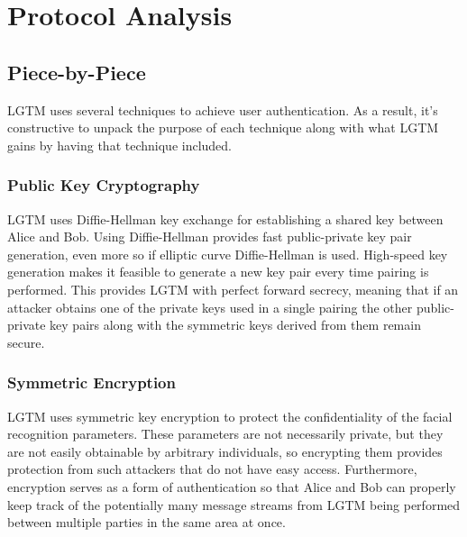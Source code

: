 \documentclass[12pt]{report}
\begin{document}
\chapter{Protocol Analysis}
\section{Piece-by-Piece}
LGTM uses several techniques to achieve user authentication. As a result, it's constructive to unpack the purpose of each technique along with what LGTM gains by having that technique included. \par

\subsection{Public Key Cryptography}
LGTM uses Diffie-Hellman key exchange \cite{DiffieHellman2006} for establishing a shared key between Alice and Bob. Using Diffie-Hellman provides fast public-private key pair generation, even more so if elliptic curve Diffie-Hellman is used. High-speed key generation makes it feasible to generate a new key pair every time pairing is performed. This provides LGTM with perfect forward secrecy, meaning that if an attacker obtains one of the private keys used in a single pairing the other public-private key pairs along with the symmetric keys derived from them remain secure. \par

\subsection{Symmetric Encryption}
LGTM uses symmetric key encryption to protect the confidentiality of the facial recognition parameters. These parameters are not necessarily private, but they are not easily obtainable by arbitrary individuals, so encrypting them provides protection from such attackers that do not have easy access. Furthermore, encryption serves as a form of authentication so that Alice and Bob can properly keep track of the potentially many message streams from LGTM being performed between multiple parties in the same area at once. \par
\end{document}
